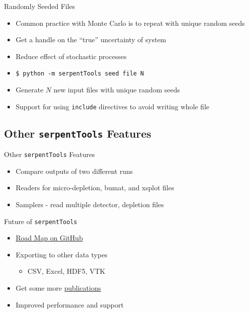 \documentclass{beamer}
\newcommand{\st}{\texttt{serpentTools} }
\begin{document}
\begin{frame}{Randomly Seeded Files}
    \begin{itemize}
        \item Common practice with Monte Carlo is to repeat with unique random seeds
        \item Get a handle on the ``true'' uncertainty of system
        \item Reduce effect of stochastic processes
        \item \texttt{\$ python -m serpentTools seed file N}
        \item Generate $N$ new input files with unique random seeds
        \item Support for using \texttt{include} directives to avoid writing whole file
    \end{itemize}
\end{frame}

\subsection{Other \st Features}

\begin{frame}{Other \st Features}
    \begin{itemize}
        \item{Compare outputs of two different runs}
        \item{Readers for micro-depletion, bumat, and xsplot files}
        \item{Samplers - read multiple detector, depletion files}
    \end{itemize}
\end{frame}

\begin{frame}{Future of \st}
    \begin{itemize}
        \item{\href{https://github.com/CORE-GATECH-GROUP/serpent-tools/wiki/Road-Map}{Road Map on GitHub}}
        \item{Exporting to other data types}
        \begin{itemize}
            \item{CSV, Excel, HDF5, VTK}
        \end{itemize}
        \item{Get some more \href{https://github.com/CORE-GATECH-GROUP/serpent-tools/wiki/Publications-using-serpentTools}{publications}}
        \item{Improved performance and support}
    \end{itemize}
\end{frame}
\end{document}
